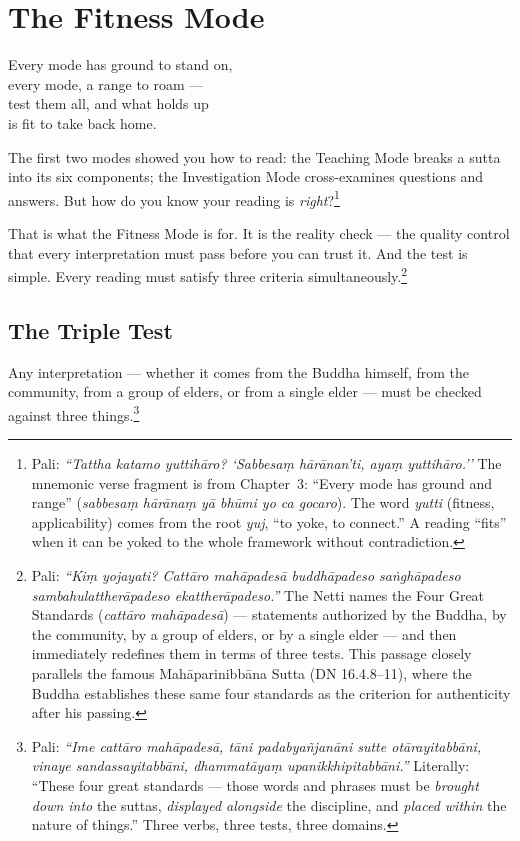 \chapter{The Fitness Mode}
\label{ch:fitness}

\begin{versebox}
Every mode has ground to stand on,\\
every mode, a range to roam ---\\
test them all, and what holds up\\
is fit to take back home.
\end{versebox}

\noindent The first two modes showed you how to read: the Teaching Mode breaks a sutta into its six components; the Investigation Mode cross-examines questions and answers. But how do you know your reading is \textit{right}?\footnote{Pali: \textit{``Tattha katamo yuttihāro? `Sabbesaṃ hārānan'ti, ayaṃ yuttihāro.''} The mnemonic verse fragment is from Chapter~3: ``Every mode has ground and range'' (\textit{sabbesaṃ hārānaṃ yā bhūmi yo ca gocaro}). The word \textit{yutti} (fitness, applicability) comes from the root \textit{yuj}, ``to yoke, to connect.'' A reading ``fits'' when it can be yoked to the whole framework without contradiction.}

That is what the Fitness Mode is for. It is the reality check --- the quality control that every interpretation must pass before you can trust it. And the test is simple. Every reading must satisfy three criteria simultaneously.\footnote{Pali: \textit{``Kiṃ yojayati? Cattāro mahāpadesā buddhāpadeso saṅghāpadeso sambahulattherāpadeso ekattherāpadeso.''} The Netti names the Four Great Standards (\textit{cattāro mahāpadesā}) --- statements authorized by the Buddha, by the community, by a group of elders, or by a single elder --- and then immediately redefines them in terms of three tests. This passage closely parallels the famous Mahāparinibbāna Sutta (DN 16.4.8--11), where the Buddha establishes these same four standards as the criterion for authenticity after his passing.}

\section*{The Triple Test}

Any interpretation --- whether it comes from the Buddha himself, from the community, from a group of elders, or from a single elder --- must be checked against three things.\footnote{Pali: \textit{``Ime cattāro mahāpadesā, tāni padabyañjanāni sutte otārayitabbāni, vinaye sandassayitabbāni, dhammatāyaṃ upanikkhipitabbāni.''} Literally: ``These four great standards --- those words and phrases must be \textit{brought down into} the suttas, \textit{displayed alongside} the discipline, and \textit{placed within} the nature of things.'' Three verbs, three tests, three domains.}


